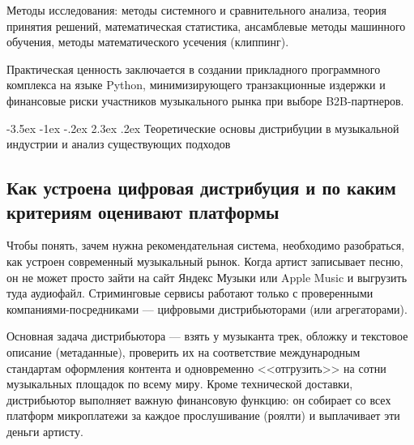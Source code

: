 \documentclass[14pt, a4paper]{extarticle}
\makeatletter
\renewcommand\section{\@startsection {section}{1}{\z@}%
 {-3.5ex \@plus -1ex \@minus -.2ex}%
 {2.3ex \@plus.2ex}%
{\centering\normalfont\Large\bfseries}}
\makeatother
\begin{document}
Методы исследования: методы системного и сравнительного анализа, теория принятия решений, математическая статистика, ансамблевые методы машинного обучения, методы математического усечения (клиппинг).

Практическая ценность заключается в создании прикладного программного комплекса на языке Python, минимизирующего транзакционные издержки и финансовые риски участников музыкального рынка при выборе B2B-партнеров.
\newpage

\section{Теоретические основы дистрибуции в музыкальной индустрии и анализ существующих подходов}

\subsection{Как устроена цифровая дистрибуция и по каким критериям оценивают платформы}
Чтобы понять, зачем нужна рекомендательная система, необходимо разобраться, как устроен современный музыкальный рынок. Когда артист записывает песню, он не может просто зайти на сайт Яндекс Музыки или Apple Music и выгрузить туда аудиофайл. Стриминговые сервисы работают только с проверенными компаниями-посредниками — цифровыми дистрибьюторами (или агрегаторами). 

Основная задача дистрибьютора — взять у музыканта трек, обложку и текстовое описание (метаданные), проверить их на соответствие международным стандартам оформления контента и одновременно <<отгрузить>> на сотни музыкальных площадок по всему миру. Кроме технической доставки, дистрибьютор выполняет важную финансовую функцию: он собирает со всех платформ микроплатежи за каждое прослушивание (роялти) и выплачивает эти деньги артисту.
\end{document}
